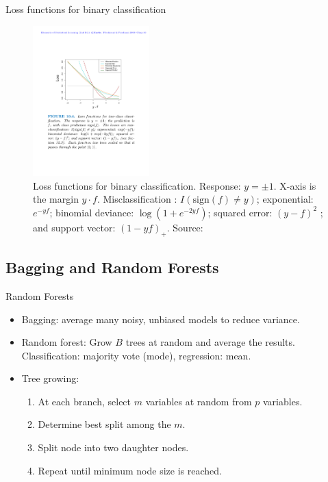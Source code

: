 \documentclass[aspectratio=169]{beamer}
\begin{document}
\begin{frame}{Loss functions for binary classification}
\begin{figure}
    \centering
    \includegraphics[width=0.4\textwidth]{figures/lossfunctions.pdf}
    \caption{Loss functions for binary classification. Response: $y = \pm1$. X-axis is the margin $y \cdot f$. Misclassification : $I(\mathrm{sign}(f) \neq y)$; exponential: $e^{-yf}$; binomial deviance: $\log(1 + e^{-2yf})$; squared error: $(y - f)^2$ ; and support vector: $(1 - yf)_+$. Source: \cite{hastieElementsStatisticalLearning2016}}
\end{figure}
\end{frame}


\subsection{Bagging and Random Forests}

\begin{frame}{Random Forests}
    \begin{itemize}
        \item Bagging: average many noisy, unbiased models to reduce variance.
        \item Random forest: Grow $B$ trees at random and average the results. Classification: majority vote (mode), regression: mean.
        \item Tree growing:
        \begin{enumerate}
            \item At each branch, select $m$ variables at random from $p$ variables.
            \item Determine best split among the $m$.
            \item Split node into two daughter nodes.
            \item Repeat until minimum node size is reached.
        \end{enumerate}
        
    \end{itemize}
\end{frame}
\end{document}
